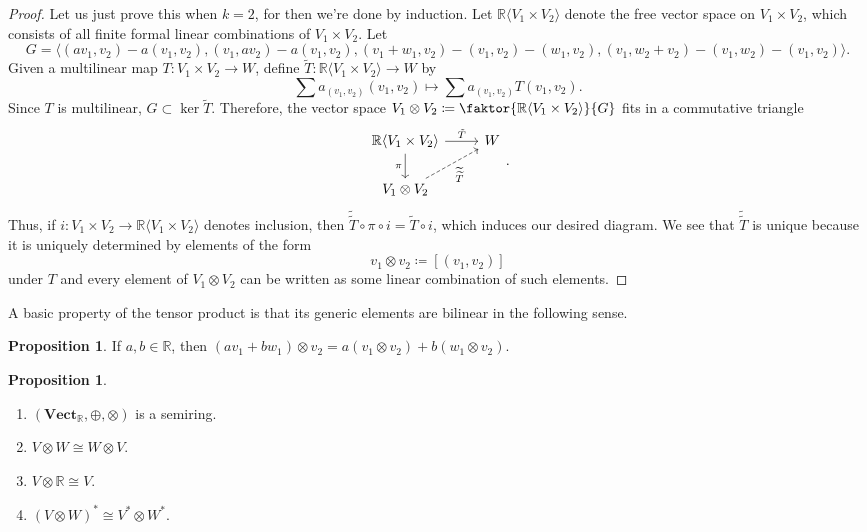 \documentclass[10pt,letterpaper,cm]{nupset}
\theoremstyle{definition}
\theoremstyle{theorem}
\newtheorem{prop}[definition]{Proposition}
\theoremstyle{remark}
\newcommand{\R}{\mathbb R}
\newcommand{\1}{\mathbf{1}}
\newcommand{\0}{\vec 0}
\begin{document}
\begin{proof}
Let us just prove this when $k=2$, for then we're done by induction. Let $\R\langle V_1 \times V_2 \rangle$ denote the free vector space on $V_1 \times V_2$, which consists of  all finite formal linear combinations of $V_1 \times V_2$. Let 
\[
G = \langle (av_1, v_2) - a(v_1, v_2), (v_1, av_2) - a(v_1, v_2), (v_1 + w_1, v_2) - (v_1, v_2)-(w_1, v_2), (v_1, w_2 + v_2) - (v_1, w_2) -(v_1, v_2)\rangle.
\]
Given a  multilinear map $T: V_1 \times V_2 \to W$, define $\widetilde{T} : \R\langle V_1 \times V_2\rangle \to W$ by $$\sum a_{(v_1, v_2)}(v_1, v_2) \mapsto \sum a_{(v_1, v_2)} T(v_1, v_2).$$ Since $T$ is multilinear, $G \subset \ker \widetilde{T}$. Therefore,  the vector space $V_1 \otimes V_2 \coloneqq  \faktor{\R\langle V_1 \times V_2 \rangle}{G}$ fits in a commutative triangle 
\[
\begin{tikzcd}
\R\langle V_1 \times V_2 \rangle \arrow[d, "\pi"'] \arrow[r, "\tilde{T}"] & W \\
V_1 \otimes V_2 \arrow[ru, "\widetilde{\widetilde{T}}"', dashed] & 
\end{tikzcd}.
\]
Thus, if $i: V_1 \times V_2 \to \R\langle V_1 \times V_2 \rangle$ denotes inclusion, then $\widetilde{\widetilde{T}} \circ \pi \circ i = \widetilde{T} \circ i$, which induces our desired diagram. We see that $\widetilde{\widetilde{T}}$ is unique because it is uniquely determined by elements of the form $$v_1 \otimes v_2\coloneqq \left[(v_1, v_2)\right]$$ under $T$ and every element of $V_1 \otimes V_2$ can be written as some linear combination of such elements.
\end{proof}

\smallskip

A basic property of the tensor product is that its generic elements are bilinear in the following sense.

\begin{prop}
If $a,b \in \R$, then $\left(av_1 + bw_1\right) \otimes v_2 = a(v_1 \otimes v_2) + b(w_1 \otimes v_2)$.
\end{prop}

\begin{prop} $ $
\begin{enumerate}
\item $\left(\mathbf{Vect}_{\R}, \oplus, \otimes\right)$ is a semiring. 
\item $V \otimes W \cong W \otimes V$.
\item $V \otimes \R \cong V$.
\item $\left(V \otimes W\right)^{\ast} \cong V^{\ast} \otimes W^{\ast}$.
\end{enumerate}
\end{prop}
\end{document}
